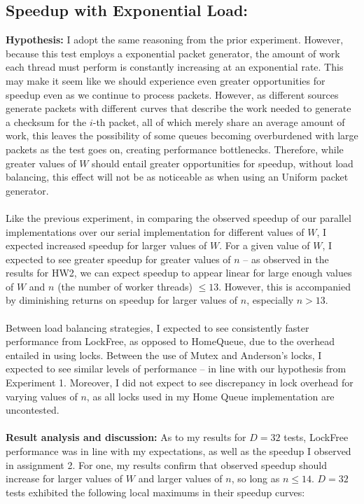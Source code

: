 \documentclass[]{article}
\begin{document}
\subsection{Speedup with Exponential Load:}
\textbf{Hypothesis:}
I adopt the same reasoning from the prior experiment. However, because this test employs a exponential packet generator, the amount of work each thread must perform is constantly increasing at an exponential rate. This may make it seem like we should experience even greater opportunities for speedup even as we continue to process packets. However, as different sources generate packets with different curves that describe the work needed to generate a checksum for the $i$-th packet, all of which merely share an average amount of work, this leaves the possibility of some queues becoming overburdened with large packets as the test goes on, creating performance bottlenecks. Therefore, while greater values of $W$ should entail greater opportunities for speedup, without load balancing, this effect will not be as noticeable as when using an Uniform packet generator.
\\\\
Like the previous experiment, in comparing the observed speedup of our parallel implementations over our serial implementation for different values of $W$, I expected increased speedup for larger values of $W$. For a given value of $W$, I expected to see greater speedup for greater values of $n$ -- as observed in the results for HW2, we can expect speedup to appear linear for large enough values of $W$ and $n$ (the number of worker threads) $\leq 13$. However, this is accompanied by diminishing returns on speedup for larger values of $n$, especially $n > 13$.
\\\\
Between load balancing strategies, I expected to see consistently faster performance from LockFree, as opposed to HomeQueue, due to the overhead entailed in using locks. Between the use of Mutex and Anderson's locks, I expected to see similar levels of performance -- in line with our hypothesis from Experiment 1. Moreover, I did not expect to see discrepancy in lock overhead for varying values of $n$, as all locks used in my Home Queue implementation are uncontested.
\\\\
\textbf{Result analysis and discussion:}
As to my results for $D = 32$ tests, LockFree performance was in line with my expectations, as well as the speedup I observed in assignment 2. For one, my results confirm that observed speedup should increase for larger values of $W$ and larger values of $n$, so long as $n \leq 14$. $D = 32$ tests exhibited the following local maximums in their speedup curves:
\end{document}
